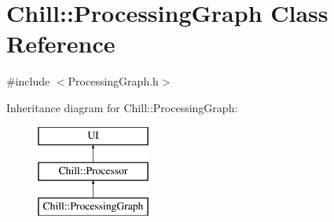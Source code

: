 \hypertarget{class_chill_1_1_processing_graph}{}\section{Chill\+:\+:Processing\+Graph Class Reference}
\label{class_chill_1_1_processing_graph}


{\ttfamily \#include $<$Processing\+Graph.\+h$>$}

Inheritance diagram for Chill\+:\+:Processing\+Graph\+:\begin{figure}[H]
\begin{center}
\leavevmode
\includegraphics[height=3.000000cm]{class_chill_1_1_processing_graph}
\end{center}
\end{figure}
